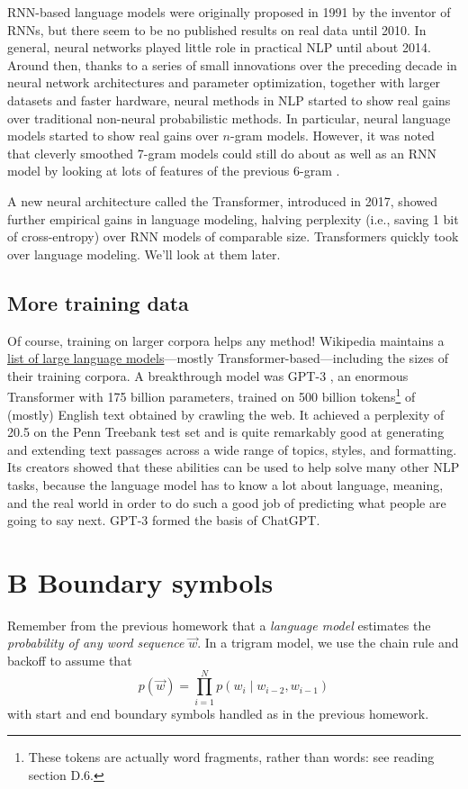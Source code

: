 RNN-based language models were originally proposed in 1991 by the inventor of RNNs, but there seem to be no published results on real data until 2010. In general, neural networks played little role in practical NLP until about 2014. Around then, thanks to a series of small innovations over the preceding decade in neural network architectures and parameter optimization, together with larger datasets and faster hardware, neural methods in NLP started to show real gains over traditional non-neural probabilistic methods. In particular, neural language models started to show real gains over $n$-gram models. However, it was noted that cleverly smoothed 7-gram models could still do about as well as an RNN model by looking at lots of features of the previous 6-gram \cite{Peleman2016}.

A new neural architecture called the Transformer, introduced in 2017, showed further empirical gains in language modeling, halving perplexity (i.e., saving 1 bit of cross-entropy) over RNN models of comparable size. Transformers quickly took over language modeling. We’ll look at them later.

\subsection*{More training data}
Of course, training on larger corpora helps any method! Wikipedia maintains a \href{https://en.wikipedia.org/wiki/List_of_large_language_models}{list of large language models}—mostly Transformer-based—including the sizes of their training corpora. A breakthrough model was GPT-3 \cite{Brown2020}, an enormous Transformer with 175 billion parameters, trained on 500 billion tokens\footnote{These tokens are actually word fragments, rather than words: see reading section D.6.} of (mostly) English text obtained by crawling the web. It achieved a perplexity of 20.5 on the Penn Treebank test set and is quite remarkably good at generating and extending text passages across a wide range of topics, styles, and formatting. Its creators showed that these abilities can be used to help solve many other NLP tasks, because the language model has to know a lot about language, meaning, and the real world in order to do such a good job of predicting what people are going to say next. GPT-3 formed the basis of ChatGPT.

\section*{B Boundary symbols}
Remember from the previous homework that a \textit{language model} estimates the \textit{probability of any word sequence} $\vec{w}$. In a trigram model, we use the chain rule and backoff to assume that
\[
p(\vec{w}) = \prod_{i=1}^{N} p(w_i \mid w_{i-2}, w_{i-1})
\]
with start and end boundary symbols handled as in the previous homework.

